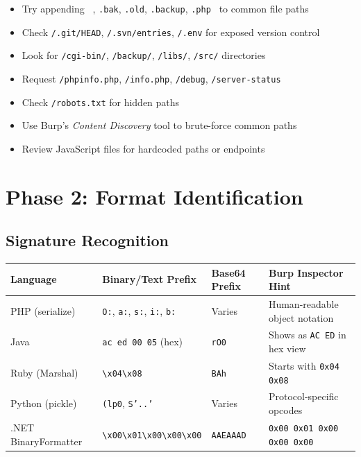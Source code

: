 \documentclass[11pt]{article}
\begin{document}
\begin{checklistbox}
\begin{itemize}
    \item[\checkmark] Try appending \texttt{~}, \texttt{.bak}, \texttt{.old}, \texttt{.backup}, \texttt{.php~} to common file paths
    \item[\checkmark] Check \texttt{/.git/HEAD}, \texttt{/.svn/entries}, \texttt{/.env} for exposed version control
    \item[\checkmark] Look for \texttt{/cgi-bin/}, \texttt{/backup/}, \texttt{/libs/}, \texttt{/src/} directories
    \item[\checkmark] Request \texttt{/phpinfo.php}, \texttt{/info.php}, \texttt{/debug}, \texttt{/server-status}
    \item[\checkmark] Check \texttt{/robots.txt} for hidden paths
    \item[\checkmark] Use Burp's \textit{Content Discovery} tool to brute-force common paths
    \item[\checkmark] Review JavaScript files for hardcoded paths or endpoints
\end{itemize}
\end{checklistbox}

\section{Phase 2: Format Identification}

\subsection{Signature Recognition}

\begin{center}
\begin{tabular}{|l|l|l|l|}
\hline
\textbf{Language} & \textbf{Binary/Text Prefix} & \textbf{Base64 Prefix} & \textbf{Burp Inspector Hint} \\
\hline
PHP (serialize) & \texttt{O:}, \texttt{a:}, \texttt{s:}, \texttt{i:}, \texttt{b:} & Varies & Human-readable object notation \\
Java & \texttt{ac ed 00 05} (hex) & \texttt{rO0} & Shows as \texttt{AC ED} in hex view \\
Ruby (Marshal) & \verb|\x04\x08| & \texttt{BAh} & Starts with \texttt{0x04 0x08} \\
Python (pickle) & \texttt{(lp0}, \texttt{S'..'} & Varies & Protocol-specific opcodes \\
.NET BinaryFormatter & \verb|\x00\x01\x00\x00\x00| & \texttt{AAEAAAD} & \texttt{0x00 0x01 0x00 0x00 0x00} \\
\hline
\end{tabular}
\end{center}
\end{document}
